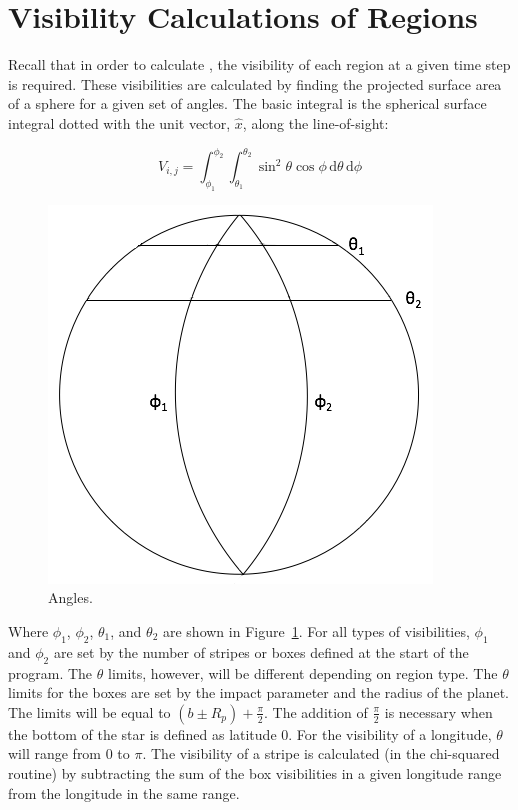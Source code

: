 









\section{Visibility Calculations of Regions \label{vis}}
Recall that in order to calculate \fmod, the visibility of each region at a given time step is required. These visibilities are calculated by finding the projected surface area of a sphere for a given set of angles. The basic integral is the spherical surface integral dotted with the unit vector, $\hat{x}$, along the line-of-sight:

\begin{equation}
	V_{i,j} = \int_{\phi_1}^{\phi_2} \int_{\theta_1}^{\theta_2} \sin^2{\theta}\cos{\phi}\,\mathrm{d}\theta \, \mathrm{d}\phi
\end{equation}

\begin{figure}[h]
	\centering
	\includegraphics[width=.5\textwidth]{images/angles.png}
	\caption{Angles.}
	\label{angles}
\end{figure}

Where $\phi_1$, $\phi_2$, $\theta_1$, and $\theta_2$ are shown in Figure~\ref{angles}. For all types of visibilities, $\phi_1$ and $\phi_2$ are set by the number of stripes or boxes defined at the start of the program. The $\theta$ limits, however, will be different depending on region type.
The $\theta$ limits for the boxes are set by the impact parameter and the radius of the planet. The limits will be equal to $(b \pm R_p) + \frac{\pi}{2}$. The addition of $\frac{\pi}{2}$ is necessary when the bottom of the star is defined as latitude 0. For the visibility of a longitude, $\theta$ will range from 0 to $\pi$. The visibility of a stripe is calculated (in the chi-squared routine) by subtracting the sum of the box visibilities in a given longitude range from the longitude in the same range.

